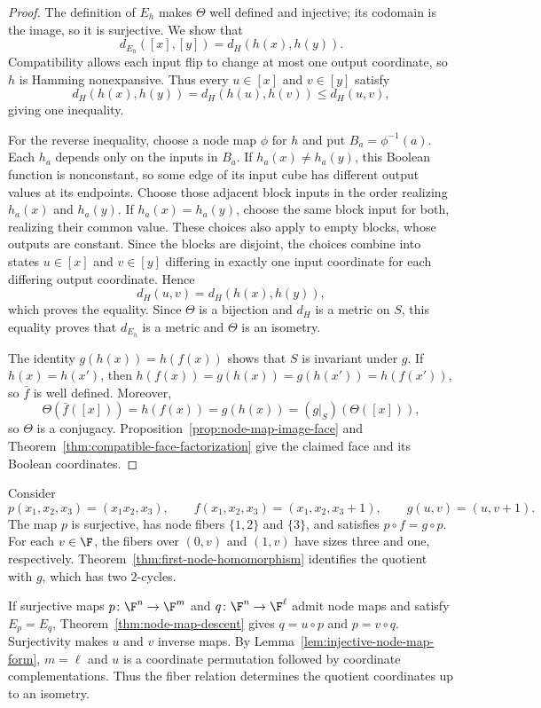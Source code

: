 \begin{proof}
The definition of $E_h$ makes $\Theta$ well defined and injective; its codomain is the image, so it is surjective. We show that
\[
    d_{E_h}([x],[y])=d_H(h(x),h(y)).
\]
Compatibility allows each input flip to change at most one output coordinate, so $h$ is Hamming nonexpansive. Thus every $u\in[x]$ and $v\in[y]$ satisfy
\[
    d_H(h(x),h(y))=d_H(h(u),h(v))\le d_H(u,v),
\]
giving one inequality.

For the reverse inequality, choose a node map $\phi$ for $h$ and put $B_a=\phi^{-1}(a)$. Each $h_a$ depends only on the inputs in $B_a$. If $h_a(x)\ne h_a(y)$, this Boolean function is nonconstant, so some edge of its input cube has different output values at its endpoints. Choose those adjacent block inputs in the order realizing $h_a(x)$ and $h_a(y)$. If $h_a(x)=h_a(y)$, choose the same block input for both, realizing their common value. These choices also apply to empty blocks, whose outputs are constant. Since the blocks are disjoint, the choices combine into states $u\in[x]$ and $v\in[y]$ differing in exactly one input coordinate for each differing output coordinate. Hence
\[
    d_H(u,v)=d_H(h(x),h(y)),
\]
which proves the equality. Since $\Theta$ is a bijection and $d_H$ is a metric on $S$, this equality proves that $d_{E_h}$ is a metric and $\Theta$ is an isometry.

The identity $g(h(x))=h(f(x))$ shows that $S$ is invariant under $g$. If $h(x)=h(x')$, then $h(f(x))=g(h(x))=g(h(x'))=h(f(x'))$, so $\bar f$ is well defined. Moreover,
\[
    \Theta(\bar f([x]))=h(f(x))=g(h(x))=(g|_S)(\Theta([x])),
\]
so $\Theta$ is a conjugacy.
Proposition~\ref{prop:node-map-image-face} and Theorem~\ref{thm:compatible-face-factorization} give the claimed face and its Boolean coordinates.
\end{proof}

\begin{example}\label{ex:and-homomorphism}
Consider
\[
    p(x_1,x_2,x_3)=(x_1x_2,x_3),\qquad
    f(x_1,x_2,x_3)=(x_1,x_2,x_3+1),\qquad
    g(u,v)=(u,v+1).
\]
The map $p$ is surjective, has node fibers $\{1,2\}$ and $\{3\}$, and satisfies $p\circ f=g\circ p$. For each $v\in\F$, the fibers over $(0,v)$ and $(1,v)$ have sizes three and one, respectively. Theorem~\ref{thm:first-node-homomorphism} identifies the quotient with $g$, which has two $2$-cycles.
\end{example}

If surjective maps $p\colon\F^n\to\F^m$ and $q\colon\F^n\to\F^\ell$ admit node maps and satisfy $E_p=E_q$, Theorem~\ref{thm:node-map-descent} gives $q=u\circ p$ and $p=v\circ q$. Surjectivity makes $u$ and $v$ inverse maps. By Lemma~\ref{lem:injective-node-map-form}, $m=\ell$ and $u$ is a coordinate permutation followed by coordinate complementations. Thus the fiber relation determines the quotient coordinates up to an isometry.

